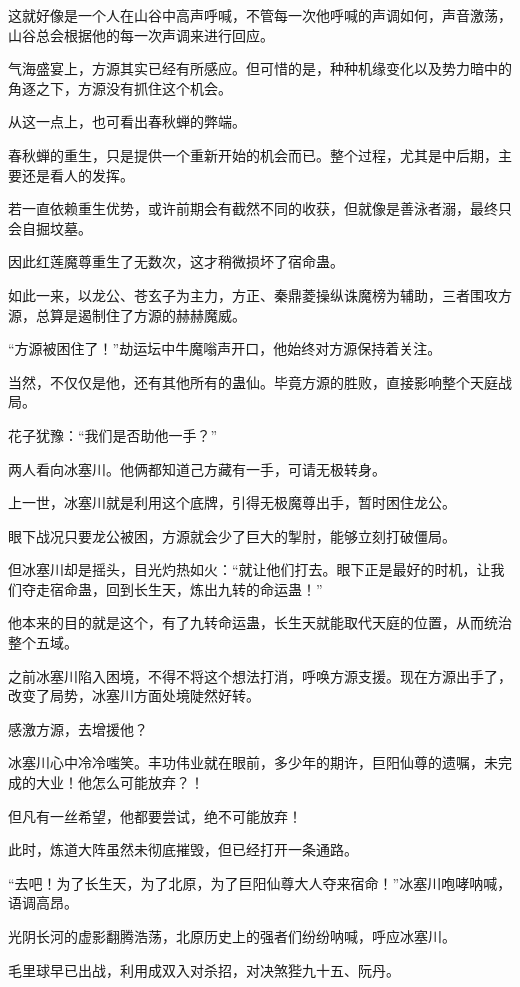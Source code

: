 \begin{this_body}
这就好像是一个人在山谷中高声呼喊，不管每一次他呼喊的声调如何，声音激荡，山谷总会根据他的每一次声调来进行回应。

气海盛宴上，方源其实已经有所感应。但可惜的是，种种机缘变化以及势力暗中的角逐之下，方源没有抓住这个机会。

从这一点上，也可看出春秋蝉的弊端。

春秋蝉的重生，只是提供一个重新开始的机会而已。整个过程，尤其是中后期，主要还是看人的发挥。

若一直依赖重生优势，或许前期会有截然不同的收获，但就像是善泳者溺，最终只会自掘坟墓。

因此红莲魔尊重生了无数次，这才稍微损坏了宿命蛊。

如此一来，以龙公、苍玄子为主力，方正、秦鼎菱操纵诛魔榜为辅助，三者围攻方源，总算是遏制住了方源的赫赫魔威。

“方源被困住了！”劫运坛中牛魔嗡声开口，他始终对方源保持着关注。

当然，不仅仅是他，还有其他所有的蛊仙。毕竟方源的胜败，直接影响整个天庭战局。

花子犹豫：“我们是否助他一手？”

两人看向冰塞川。他俩都知道己方藏有一手，可请无极转身。

上一世，冰塞川就是利用这个底牌，引得无极魔尊出手，暂时困住龙公。

眼下战况只要龙公被困，方源就会少了巨大的掣肘，能够立刻打破僵局。

但冰塞川却是摇头，目光灼热如火：“就让他们打去。眼下正是最好的时机，让我们夺走宿命蛊，回到长生天，炼出九转的命运蛊！”

他本来的目的就是这个，有了九转命运蛊，长生天就能取代天庭的位置，从而统治整个五域。

之前冰塞川陷入困境，不得不将这个想法打消，呼唤方源支援。现在方源出手了，改变了局势，冰塞川方面处境陡然好转。

感激方源，去增援他？

冰塞川心中冷冷嗤笑。丰功伟业就在眼前，多少年的期许，巨阳仙尊的遗嘱，未完成的大业！他怎么可能放弃？！

但凡有一丝希望，他都要尝试，绝不可能放弃！

此时，炼道大阵虽然未彻底摧毁，但已经打开一条通路。

“去吧！为了长生天，为了北原，为了巨阳仙尊大人夺来宿命！”冰塞川咆哮呐喊，语调高昂。

光阴长河的虚影翻腾浩荡，北原历史上的强者们纷纷呐喊，呼应冰塞川。

毛里球早已出战，利用成双入对杀招，对决煞狴九十五、阮丹。


\end{this_body}
